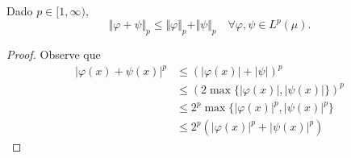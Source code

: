 \documentclass{article}
\theoremstyle{definition}
\numberwithin{equation}{section}
\begin{document}
\begin{thm}
	Dado $p\in[1,\infty)$,
	\[\Vert \varphi+\psi\Vert_p\leq\Vert\varphi\Vert_p+\Vert\psi\Vert_p\quad\forall\varphi,\psi\in L^p(\mu).\]
\end{thm}
\begin{proof}
	Observe que
	\begin{align*}
		|\varphi(x)+\psi(x)|^p&\leq (|\varphi(x)|+|\psi|)^p\\
		&\leq(2\max\{|\varphi(x)|,|\psi(x)|\})^p\\
		&\leq 2^p\max\{|\varphi(x)|^p,|\psi(x)|^p\}\\
		&\leq2^p(|\varphi(x)|^p+|\psi(x)|^p)
	\end{align*}
	

\end{proof}

\iffalse
\clearpage
\end{document}
